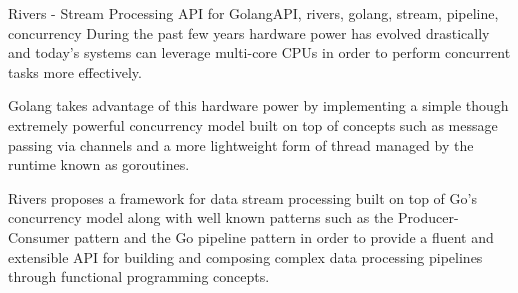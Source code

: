 \documentclass[cic,tc]{iiufrgs}
\begin{document}
\begin{englishabstract}{Rivers - Stream Processing API for Golang}{API, rivers, golang, stream, pipeline, concurrency}
During the past few years hardware power has evolved drastically and today's systems can leverage multi-core CPUs in order to perform concurrent tasks more effectively.

Golang takes advantage of this hardware power by implementing a simple though extremely powerful concurrency model built on top of concepts such as message passing via channels and a more lightweight form of thread managed by the runtime known as goroutines.

Rivers proposes a framework for data stream processing built on top of Go's concurrency model along with well known patterns such as the Producer-Consumer pattern and the Go pipeline pattern in order to provide a fluent and extensible API for building and composing complex data processing pipelines through functional programming concepts.
\end{englishabstract}

\onehalfspacing















%
%



\end{document}
